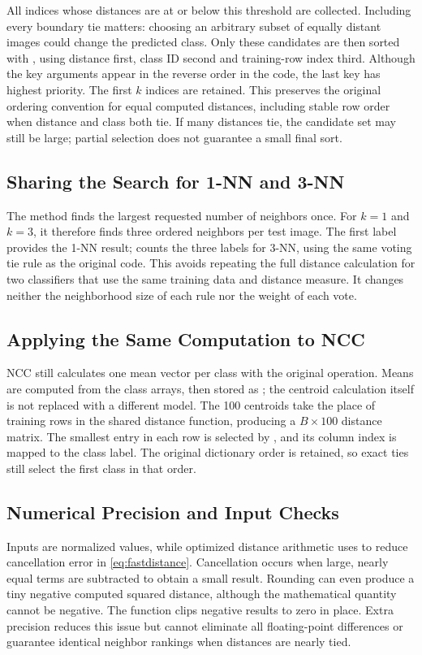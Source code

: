 All indices whose distances are at or below this threshold are collected.
Including every boundary tie matters: choosing an arbitrary subset of
equally distant images could change the predicted class. Only these
candidates are then sorted with , using distance first,
class ID second and training-row index third. Although the key arguments
appear in the reverse order in the code, the last key has highest priority.
The first $k$ indices are retained. This preserves the original ordering
convention for equal computed distances, including stable row order when
distance and class both tie. If many distances tie, the candidate set may
still be large; partial selection does not guarantee a small final sort.

\subsection{Sharing the Search for 1-NN and 3-NN}
The method  finds the largest requested number of
neighbors once. For $k=1$ and $k=3$, it therefore finds three ordered
neighbors per test image. The first label provides the 1-NN result;
 counts the three labels for 3-NN, using the same voting
tie rule as the original code. This avoids repeating the full distance
calculation for two classifiers that use the same training data and
distance measure. It changes neither the neighborhood size of each rule
nor the weight of each vote.

\subsection{Applying the Same Computation to NCC}
NCC still calculates one mean vector per class with the original
 operation. Means are computed from the 
class arrays, then stored as ; the centroid calculation itself
is not replaced with a different model. The 100 centroids take the place
of training rows in the shared distance function, producing a
$B\times100$ distance matrix. The smallest entry in each row is selected
by , and its column index is mapped to the class label.
The original dictionary order is retained, so exact ties still select
the first class in that order.

\subsection{Numerical Precision and Input Checks}
Inputs are normalized  values, while optimized distance
arithmetic uses  to reduce cancellation error in
\eqref{eq:fastdistance}. Cancellation occurs when large, nearly equal
terms are subtracted to obtain a small result. Rounding can even produce
a tiny negative computed squared distance, although the mathematical
quantity cannot be negative. The function clips negative results to zero
in place. Extra precision reduces this issue but cannot eliminate all
floating-point differences or guarantee identical neighbor rankings when
distances are nearly tied.

